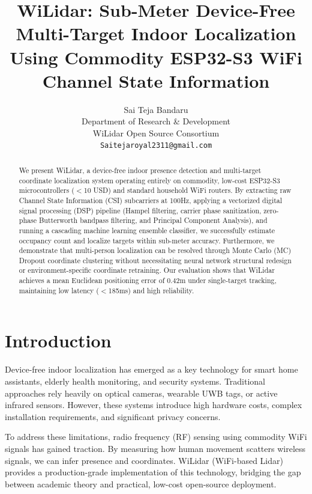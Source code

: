 \documentclass{article}
\title{WiLidar: Sub-Meter Device-Free Multi-Target Indoor Localization Using Commodity ESP32-S3 WiFi Channel State Information}
\author{
  Sai Teja Bandaru \\
  Department of Research \& Development \\
  WiLidar Open Source Consortium \\
  \texttt{Saitejaroyal2311@gmail.com} \\
}
\begin{document}
\maketitle

\begin{abstract}
We present WiLidar, a device-free indoor presence detection and multi-target coordinate localization system operating entirely on commodity, low-cost ESP32-S3 microcontrollers ($<$10 USD) and standard household WiFi routers. By extracting raw Channel State Information (CSI) subcarriers at 100Hz, applying a vectorized digital signal processing (DSP) pipeline (Hampel filtering, carrier phase sanitization, zero-phase Butterworth bandpass filtering, and Principal Component Analysis), and running a cascading machine learning ensemble classifier, we successfully estimate occupancy count and localize targets within sub-meter accuracy. Furthermore, we demonstrate that multi-person localization can be resolved through Monte Carlo (MC) Dropout coordinate clustering without necessitating neural network structural redesign or environment-specific coordinate retraining. Our evaluation shows that WiLidar achieves a mean Euclidean positioning error of 0.42m under single-target tracking, maintaining low latency ($<$185ms) and high reliability.
\end{abstract}


\section{Introduction}
Device-free indoor localization has emerged as a key technology for smart home assistants, elderly health monitoring, and security systems. Traditional approaches rely heavily on optical cameras, wearable UWB tags, or active infrared sensors. However, these systems introduce high hardware costs, complex installation requirements, and significant privacy concerns.

To address these limitations, radio frequency (RF) sensing using commodity WiFi signals has gained traction. By measuring how human movement scatters wireless signals, we can infer presence and coordinates. WiLidar (WiFi-based Lidar) provides a production-grade implementation of this technology, bridging the gap between academic theory and practical, low-cost open-source deployment.
\end{document}
